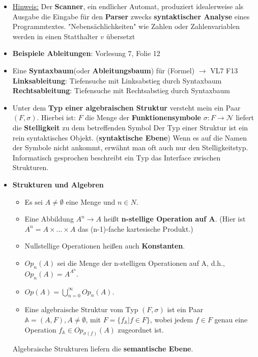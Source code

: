 \documentclass[12pt, a4paper]{article}
\begin{document}
\begin{itemize}
		\item \underline{Hinweis:} Der \textbf{Scanner}, ein endlicher Automat, produziert idealerweise als Ausgabe die Eingabe für den \textbf{Parser} zwecks \textbf{syntaktischer Analyse} eines Programmtextes.
			\subitem "Nebensächlichkeiten" wie Zahlen oder Zahlenvariablen werden in einen Statthalter $v$ übersetzt
		
		\item \textbf{Beispiele Ableitungen}: Vorlesung 7, Folie 12 
		
		\item Eine \textbf{Syntaxbaum}(oder \textbf{Ableitungsbaum}) für (Formel) $\rightarrow$ VL7 F13
			\subitem \textbf{Linksableitung}: Tiefensuche mit Linksabstieg durch Syntaxbaum
			\subitem \textbf{Rechtsableitung}: Tiefensuche mit Rechtsabstieg durch Syntaxbaum
		
		\item Unter dem \textbf{Typ einer algebraischen Struktur} versteht mein ein Paar $(F,\sigma)$. Hierbei ist:
			\subitem $F$ die Menge der \textbf{Funktionensymbole}
			\subitem $\sigma:F\rightarrow\mathcal{N}$ liefert die \textbf{Stelligkeit} zu dem betreffenden Symbol
			\subitem Der Typ einer Struktur ist ein rein syntaktisches Objekt. (\textbf{syntaktische Ebene})
			\subitem Wenn es auf die Namen der Symbole nicht ankommt, erwähnt man oft auch nur den Stelligkeitstyp.
			\subitem Informatisch gesprochen beschreibt ein Typ das Interface zwischen Strukturen.
		
		\item \textbf{Strukturen und Algebren}
			\begin{itemize}
				\item Es sei $A\neq\emptyset$ eine Menge und $n\in N$.
				
				\item Eine Abbildung $A^{n}\rightarrow A$ heißt \textbf{n-stellige Operation auf A}.
					\subitem (Hier ist $A^{n}=A\times...\times A$ das (n-1)-fache kartesische Produkt.)
				
				\item Nullstellige Operationen heißen auch \textbf{Konstanten}.
				
				\item  $Op_{n}(A)$ sei die Menge der n-stelligen Operationen auf A, d.h., $Op_{n}(A) = A^{A^{n}}$.
				
				\item $Op(A) = \bigcup_{n=0}^{\infty}Op_{n}(A)$.
				
				\item Eine algebraische Struktur vom Typ $(F,\sigma)$ ist ein Paar $\mathbb{A}=(A,F),A\neq\emptyset$,	mit $F=\{f_{\mathbb{A}}|f\in F\}$,
				wobei jedem $f\in F$ genau eine Operation $f_{\mathbb{A}}\in Op_{\sigma(f)}(A)$ zugeordnet ist.
			\end{itemize}
			\subitem Algebraische Strukturen liefern die \textbf{semantische Ebene}.
		

\end{itemize}
\end{document}
